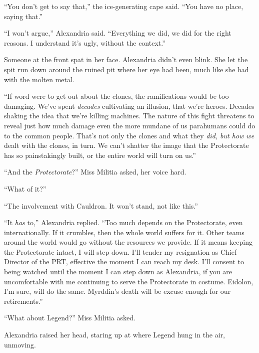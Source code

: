 ``You don't get to say that,'' the ice-generating cape said.  ``You have no place, saying that.''



``I won't argue,'' Alexandria said.  ``Everything we did, we did for the right reasons.  I understand it's ugly, without the context.''



Someone at the front spat in her face.  Alexandria didn't even blink.  She let the spit run down around the ruined pit where her eye had been, much like she had with the molten metal.



``If word were to get out about the clones, the ramifications would be too damaging.  We've spent \emph{decades} cultivating an illusion, that we're heroes.  Decades shaking the idea that we're killing machines.  The nature of this fight threatens to reveal just how much damage even the more mundane of us parahumans could do to the common people.  That's not only the clones and what they\emph{ did, but how we} dealt with the clones, in turn.  We can't shatter the image that the Protectorate has so painstakingly built, or the entire world will turn on us.''



``And the \emph{Protectorate}?'' Miss Militia asked, her voice hard.



``What of it?''



``The involvement with Cauldron.  It won't stand, not like this.''



``It \emph{has} to,'' Alexandria replied.  ``Too much depends on the Protectorate, even internationally.  If it crumbles, then the whole world suffers for it.  Other teams around the world would go without the resources we provide.  If it means keeping the Protectorate intact, I will step down.  I'll tender my resignation as Chief Director of the PRT, effective the moment I can reach my desk.  I'll consent to being watched until the moment I can step down as Alexandria, if you are uncomfortable with me continuing to serve the Protectorate in costume.  Eidolon, I'm sure, will do the same.  Myrddin's death will be excuse enough for our retirements.''



``What about Legend?'' Miss Militia asked.



Alexandria raised her head, staring up at where Legend hung in the air, unmoving.



